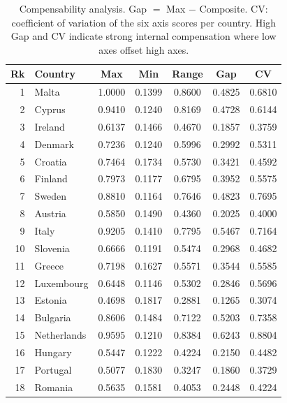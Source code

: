 \begin{table}[htbp]
\centering
\caption{Compensability analysis.  Gap $=$ Max $-$ Composite.  CV: coefficient of
variation of the six axis scores per country.  High Gap and CV indicate strong
internal compensation where low axes offset high axes.}
\label{tab:compensability}
\small
\setlength{\tabcolsep}{4pt}
\begin{tabular*}{\textwidth}{@{\extracolsep{\fill}}
  r l
  S[table-format=1.4]
  S[table-format=1.4]
  S[table-format=1.4]
  S[table-format=1.4]
  S[table-format=1.4]
  @{}}
\toprule
{\textbf{Rk}} & {\textbf{Country}} & {\textbf{Max}} & {\textbf{Min}} & {\textbf{Range}} & {\textbf{Gap}} & {\textbf{CV}} \\
 & Malta & 1.0000 & 0.1399 & 0.8600 & 0.4825 & 0.6810 \\
  2 & Cyprus & 0.9410 & 0.1240 & 0.8169 & 0.4728 & 0.6144 \\
  3 & Ireland & 0.6137 & 0.1466 & 0.4670 & 0.1857 & 0.3759 \\
  4 & Denmark & 0.7236 & 0.1240 & 0.5996 & 0.2992 & 0.5311 \\
  5 & Croatia & 0.7464 & 0.1734 & 0.5730 & 0.3421 & 0.4592 \\
  6 & Finland & 0.7973 & 0.1177 & 0.6795 & 0.3952 & 0.5575 \\
  7 & Sweden & 0.8810 & 0.1164 & 0.7646 & 0.4823 & 0.7695 \\
  8 & Austria & 0.5850 & 0.1490 & 0.4360 & 0.2025 & 0.4000 \\
  9 & Italy & 0.9205 & 0.1410 & 0.7795 & 0.5467 & 0.7164 \\
  10 & Slovenia & 0.6666 & 0.1191 & 0.5474 & 0.2968 & 0.4682 \\
  11 & Greece & 0.7198 & 0.1627 & 0.5571 & 0.3544 & 0.5585 \\
  12 & Luxembourg & 0.6448 & 0.1146 & 0.5302 & 0.2846 & 0.5696 \\
  13 & Estonia & 0.4698 & 0.1817 & 0.2881 & 0.1265 & 0.3074 \\
  14 & Bulgaria & 0.8606 & 0.1484 & 0.7122 & 0.5203 & 0.7358 \\
  15 & Netherlands & 0.9595 & 0.1210 & 0.8384 & 0.6243 & 0.8804 \\
  16 & Hungary & 0.5447 & 0.1222 & 0.4224 & 0.2150 & 0.4482 \\
  17 & Portugal & 0.5077 & 0.1830 & 0.3247 & 0.1860 & 0.3729 \\
  18 & Romania & 0.5635 & 0.1581 & 0.4053 & 0.2448 & 0.4224 \\

\end{tabular*}
\end{table}
